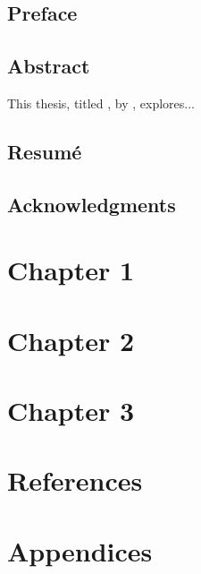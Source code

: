 \documentclass[12pt,a4paper]{report}
\begin{document}





\tableofcontents
\newpage



\newpage
\chapter*{Preface}


\chapter*{Abstract}
This thesis, titled \textit{\ThesisTitle}, by \AuthorName, explores...
\lipsum[1] %

\chapter*{Resumé}
\lipsum[2] %

\chapter*{Acknowledgments}
\lipsum[3] %

\newpage
{}

\part{Chapter 1}
\addtocounter{page}{-1}


\part{Chapter 2}
\addtocounter{page}{-1}


\part{Chapter 3}
\addtocounter{page}{-1}


\part{References}
\addtocounter{page}{-1}
\printbibliography

\part{Appendices}
\addtocounter{page}{-1}
\begin{appendices}



\end{appendices}
\end{document}
